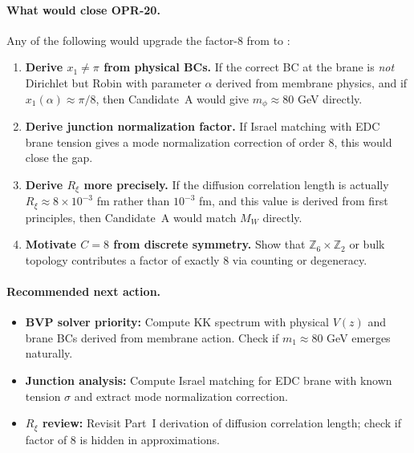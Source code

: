 \paragraph{What would close OPR-20.}
Any of the following would upgrade the factor-8 from \tagP{} to \tagDc{}:

\begin{enumerate}[nosep]
    \item \textbf{Derive $x_1 \neq \pi$ from physical BCs.}
          If the correct BC at the brane is \emph{not} Dirichlet but Robin with
          parameter $\alpha$ derived from membrane physics, and if $x_1(\alpha) \approx \pi/8$,
          then Candidate~A would give $m_\phi \approx 80$ GeV directly.

    \item \textbf{Derive junction normalization factor.}
          If Israel matching with EDC brane tension gives a mode normalization
          correction of order 8, this would close the gap.

    \item \textbf{Derive $R_\xi$ more precisely.}
          If the diffusion correlation length is actually $R_\xi \approx 8 \times 10^{-3}$ fm
          rather than $10^{-3}$ fm, and this value is derived from first principles,
          then Candidate~A would match $M_W$ directly.

    \item \textbf{Motivate $C = 8$ from discrete symmetry.}
          Show that $\mathbb{Z}_6 \times \mathbb{Z}_2$ or bulk topology contributes
          a factor of exactly 8 via counting or degeneracy.
\end{enumerate}

\paragraph{Recommended next action.}
\begin{itemize}[nosep]
    \item \textbf{BVP solver priority:} Compute KK spectrum with physical $V(z)$
          and brane BCs derived from membrane action. Check if $m_1 \approx 80$ GeV
          emerges naturally.
    \item \textbf{Junction analysis:} Compute Israel matching for EDC brane with
          known tension $\sigma$ and extract mode normalization correction.
    \item \textbf{$R_\xi$ review:} Revisit Part~I derivation of diffusion correlation
          length; check if factor of 8 is hidden in approximations.
\end{itemize}

